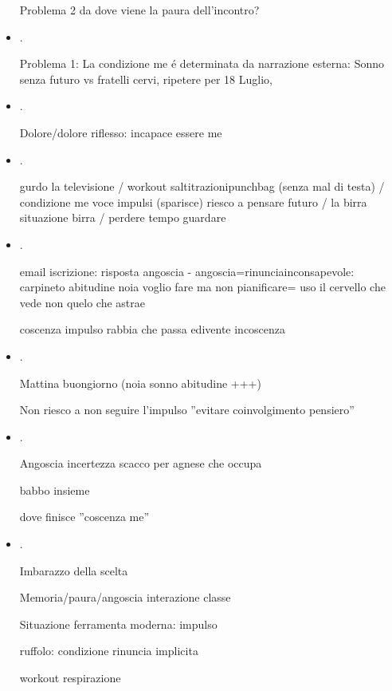 \begin{itemize}
Problema 2 da dove viene la paura dell'incontro?


\item {}.

Problema 1: La condizione me \'e determinata da narrazione esterna: Sonno senza futuro vs fratelli cervi, ripetere per 18 Luglio, 

\item {}.

Dolore/dolore riflesso: incapace essere me

\item {}.

gurdo la televisione / workout saltitrazionipunchbag (senza mal di testa) / condizione me voce impulsi (sparisce) riesco a pensare futuro / la birra situazione birra / perdere tempo guardare

\item {}.

email iscrizione: risposta angoscia - angoscia=rinunciainconsapevole: carpineto abitudine noia voglio fare ma non pianificare= uso il cervello che vede non quelo che  astrae

coscenza impulso rabbia che passa edivente incoscenza

\item {}.

Mattina buongiorno (noia sonno abitudine +++)

Non riesco a non seguire l'impulso ''evitare coinvolgimento pensiero''

\item {}.

Angoscia incertezza scacco per agnese che occupa

babbo insieme

dove finisce ''coscenza me''


\item {}.

Imbarazzo della scelta

Memoria/paura/angoscia interazione classe

Situazione ferramenta moderna: impulso

ruffolo: condizione rinuncia implicita

workout respirazione


\end{itemize}
